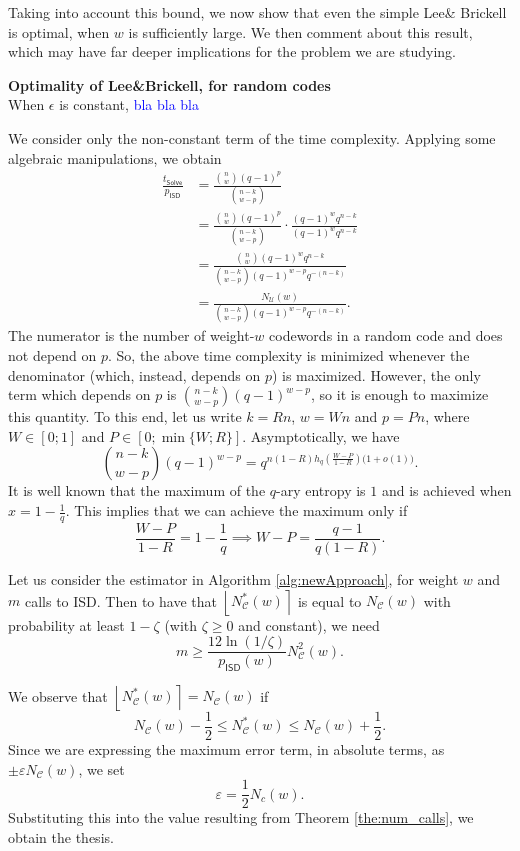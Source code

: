 Taking into account this bound, we now show that even the simple Lee\& Brickell is optimal, when $w$ is sufficiently large.
We then comment about this result, which may have far deeper implications for the problem we are studying.
\begin{theorem}\textbf{Optimality of Lee\&Brickell, for random codes}\\
When $\epsilon$ is constant, \textcolor{blue}{bla bla bla}
\end{theorem}
\begin{IEEEproof}
We consider only the non-constant term of the time complexity.
Applying some algebraic manipulations, we obtain
\begin{align*}
\frac{t_{\mathsf{Solve}}}{p_{\mathsf{ISD}}} & \nonumber = \frac{\binom{n}{w}(q-1)^p}{\binom{n-k}{w-p}}\\\nonumber
& = \frac{\binom{n}{w}(q-1)^p}{\binom{n-k}{w-p}}\cdot \frac{(q-1)^wq^{n-k}}{(q-1)^wq^{n-k}}\\\nonumber
& = \frac{\binom{n}{w}(q-1)^w q^{n-k}}{\binom{n-k}{w-p}(q-1)^{w-p}q^{-(n-k)}}\\\nonumber
& = \frac{N_{\mathcal U}(w)}{\binom{n-k}{w-p}(q-1)^{w-p}q^{-(n-k)}}.
\end{align*}
The numerator is the number of weight-$w$ codewords in a random code and does not depend on $p$.
So, the above time complexity is minimized whenever the denominator (which, instead, depends on $p$) is maximized.
However, the only term which depends on $p$ is $\binom{n-k}{w-p}(q-1)^{w-p}$, so it is enough to maximize this quantity.
To this end, let us write $k = Rn$, $w = W n$ and $p = Pn$, where $W\in [0 ; 1]$ and $P\in [0 ; \min\{W; R\}]$.
Asymptotically, we have 
$$\binom{n-k}{w-p}(q-1)^{w-p} = q^{n\left(1-R\right)h_q\left(\frac{W-P}{1-R}\right)\big(1+o(1)\big)}.$$
It is well known that the maximum of the $q$-ary entropy is $1$ and is achieved when $x = 1-\frac{1}{q}$.
This implies that we can achieve the maximum only if
$$\frac{W-P}{1-R} = 1-\frac{1}{q}\implies W-P = \frac{q-1}{q(1-R)}.$$
\end{IEEEproof}
\begin{theorem}
Let us consider the estimator in Algorithm \ref{alg:newApproach}, for weight $w$ and $m$ calls to ISD.
Then to have that $\left\lfloor N^*_{\mathscr C}(w)\right\rceil$ is equal to $N_{\mathscr C}(w)$ with probability at least $1-\zeta$ (with $\zeta\geq 0$ and constant), we need
$$m\geq \frac{12\ln(1/\zeta) }{p_{\mathsf{ISD}}(w)}N_{\mathscr C}^2(w).$$
\end{theorem}
\begin{IEEEproof}
We observe that $\left\lfloor N_{\mathscr C}^*(w)\right\rceil = N_{\mathscr C}(w)$ if
$$N_{\mathscr C}(w) - \frac{1}{2}\leq N_{\mathscr C}^*(w)\leq N_{\mathscr C}(w) + \frac{1}{2}.$$
Since we are expressing the maximum error term, in absolute terms, as $\pm \varepsilon N_{\mathscr C}(w)$, we set 
$$\varepsilon = \frac{1}{2}  N_c(w).$$
Substituting this into the value resulting from Theorem \ref{the:num_calls}, we obtain the thesis.
\end{IEEEproof}